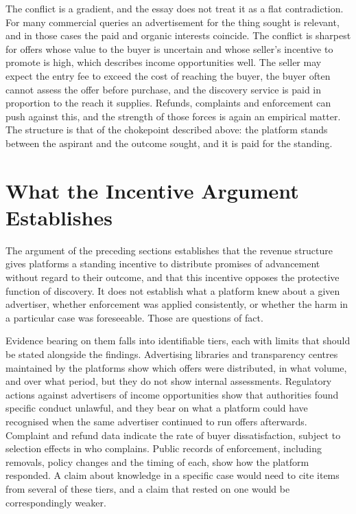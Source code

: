 \documentclass[12pt, a4paper]{article}
\begin{document}
The conflict is a gradient, and the essay does not treat it as a flat contradiction. For many commercial queries an advertisement for the thing sought is relevant, and in those cases the paid and organic interests coincide. The conflict is sharpest for offers whose value to the buyer is uncertain and whose seller's incentive to promote is high, which describes income opportunities well. The seller may expect the entry fee to exceed the cost of reaching the buyer, the buyer often cannot assess the offer before purchase, and the discovery service is paid in proportion to the reach it supplies. Refunds, complaints and enforcement can push against this, and the strength of those forces is again an empirical matter. The structure is that of the chokepoint described above: the platform stands between the aspirant and the outcome sought, and it is paid for the standing.

\section{What the Incentive Argument Establishes}
\label{sec:limits}

The argument of the preceding sections establishes that the revenue structure gives platforms a standing incentive to distribute promises of advancement without regard to their outcome, and that this incentive opposes the protective function of discovery. It does not establish what a platform knew about a given advertiser, whether enforcement was applied consistently, or whether the harm in a particular case was foreseeable. Those are questions of fact.

Evidence bearing on them falls into identifiable tiers, each with limits that should be stated alongside the findings. Advertising libraries and transparency centres maintained by the platforms show which offers were distributed, in what volume, and over what period, but they do not show internal assessments. Regulatory actions against advertisers of income opportunities show that authorities found specific conduct unlawful, and they bear on what a platform could have recognised when the same advertiser continued to run offers afterwards. Complaint and refund data indicate the rate of buyer dissatisfaction, subject to selection effects in who complains. Public records of enforcement, including removals, policy changes and the timing of each, show how the platform responded. A claim about knowledge in a specific case would need to cite items from several of these tiers, and a claim that rested on one would be correspondingly weaker.
\end{document}
